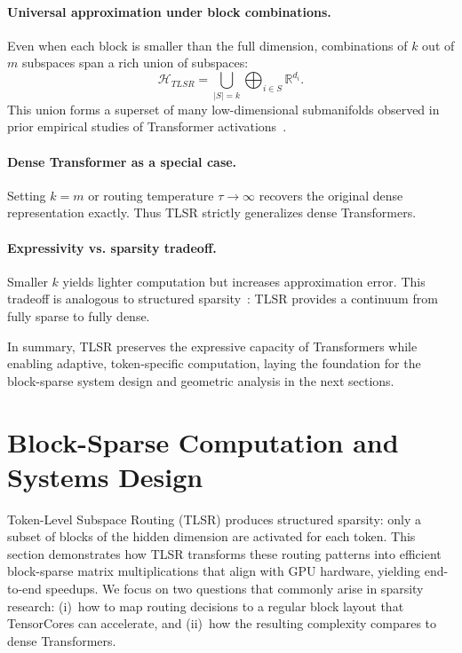 \documentclass{article}
\theoremstyle{plain}
\theoremstyle{definition}
\theoremstyle{remark}
\begin{document}
\paragraph{Universal approximation under block combinations.}
Even when each block is smaller than the full dimension, combinations of
$k$ out of $m$ subspaces span a rich union of subspaces:
\[
\mathcal{H}_{TLSR} = \bigcup_{|S|=k} \bigoplus_{i \in S} \mathbb{R}^{d_i}.
\]
This union forms a superset of many low-dimensional submanifolds observed in
prior empirical studies of Transformer activations~\cite{mickus2022muppet}.

\paragraph{Dense Transformer as a special case.}
Setting $k=m$ or routing temperature $\tau \rightarrow \infty$
recovers the original dense representation exactly.
Thus TLSR strictly generalizes dense Transformers.

\paragraph{Expressivity vs. sparsity tradeoff.}
Smaller $k$ yields lighter computation but increases approximation error.
This tradeoff is analogous to structured sparsity~\cite{fang2024maskllm,zheng2024readme}:
TLSR provides a continuum from fully sparse to fully dense.

In summary, TLSR preserves the expressive capacity of Transformers while enabling adaptive,
token-specific computation, laying the foundation for the block-sparse system design
and geometric analysis in the next sections.


\section{Block-Sparse Computation and Systems Design}

Token-Level Subspace Routing (TLSR) produces structured sparsity:
only a subset of blocks of the hidden dimension are activated for each token.
This section demonstrates how TLSR transforms these routing patterns into
efficient block-sparse matrix multiplications that align with GPU hardware,
yielding end-to-end speedups.
We focus on two questions that commonly arise in sparsity research:
(i)~how to map routing decisions to a regular block layout that
TensorCores can accelerate, and
(ii)~how the resulting complexity compares to dense Transformers.
\end{document}
